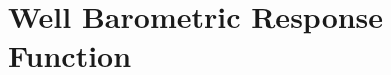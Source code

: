 \documentclass[WHATMANUAL.tex]{subfiles}
\begin{document}
\chapter{Well Barometric Response Function}\label{chap:BRF}
\end{document}
